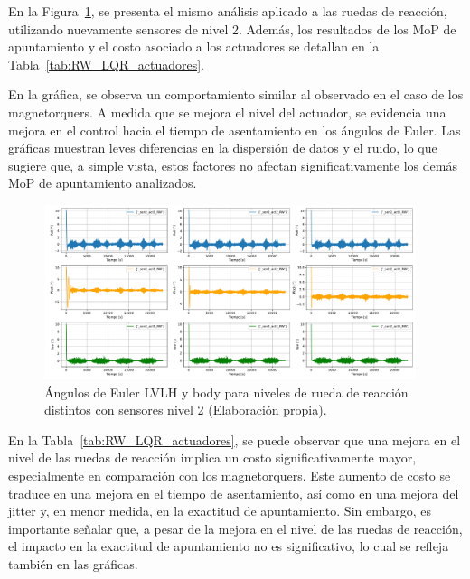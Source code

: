 En la Figura~\ref{fig:RW_LQR_actuadores}, se presenta el mismo análisis aplicado a las ruedas de reacción, utilizando nuevamente sensores de nivel 2. Además, los resultados de los MoP de apuntamiento y el costo asociado a los actuadores se detallan en la Tabla~\ref{tab:RW_LQR_actuadores}.

En la gráfica, se observa un comportamiento similar al observado en el caso de los magnetorquers. A medida que se mejora el nivel del actuador, se evidencia una mejora en el control hacia el tiempo de asentamiento en los ángulos de Euler. Las gráficas muestran leves diferencias en la dispersión de datos y el ruido, lo que sugiere que, a simple vista, estos factores no afectan significativamente los demás MoP de apuntamiento analizados.

\begin{figure}[H]
	\centering    
	\includegraphics[width=0.97\textwidth]{RW_LQR_actuadores.pdf}
	\caption{Ángulos de Euler LVLH y body para niveles de rueda de reacción distintos con sensores nivel 2 (Elaboración propia).}
	\label{fig:RW_LQR_actuadores}
\end{figure}


En la Tabla~\ref{tab:RW_LQR_actuadores}, se puede observar que una mejora en el nivel de las ruedas de reacción implica un costo significativamente mayor, especialmente en comparación con los magnetorquers. Este aumento de costo se traduce en una mejora en el tiempo de asentamiento, así como en una mejora del jitter y, en menor medida, en la exactitud de apuntamiento. Sin embargo, es importante señalar que, a pesar de la mejora en el nivel de las ruedas de reacción, el impacto en la exactitud de apuntamiento no es significativo, lo cual se refleja también en las gráficas.

